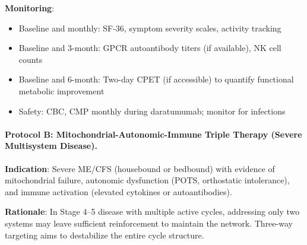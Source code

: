 \textbf{Monitoring}:
\begin{itemize}
    \item Baseline and monthly: SF-36, symptom severity scales, activity tracking
    \item Baseline and 3-month: GPCR autoantibody titers (if available), NK cell counts
    \item Baseline and 6-month: Two-day CPET (if accessible) to quantify functional metabolic improvement
    \item Safety: CBC, CMP monthly during daratumumab; monitor for infections
\end{itemize}

\paragraph{Protocol B: Mitochondrial-Autonomic-Immune Triple Therapy (Severe Multisystem Disease).}

\textbf{Indication}: Severe ME/CFS (housebound or bedbound) with evidence of mitochondrial failure, autonomic dysfunction (POTS, orthostatic intolerance), and immune activation (elevated cytokines or autoantibodies).

\textbf{Rationale}: In Stage 4--5 disease with multiple active cycles, addressing only two systems may leave sufficient reinforcement to maintain the network. Three-way targeting aims to destabilize the entire cycle structure.

